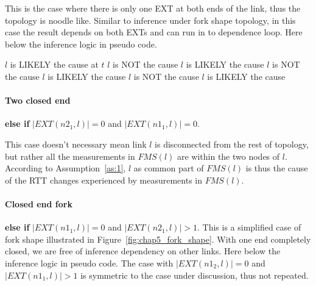 This is the case where there is only one \ac{EXT} at both ends of the link, thus the topology is noodle like.
Similar to inference under fork shape topology, in this case the result depends on both \acp{EXT} and can run in to dependence loop. Here below the inference logic in pseudo code.

\begin{algorithmic}
	\State $l$ is LIKELY the cause at $t$ 
\Else {}
	 
			\State $l$ is NOT the cause 
		\Else
			\State $l$ is LIKELY the cause 
		\EndIf
	 
			\State $l$ is NOT the cause 
		\Else
			\State $l$ is LIKELY the cause 
		\EndIf
	\Else {}
			\State $l$ is NOT the cause 
		\Else
			\State $l$ is LIKELY the cause 
		\EndIf
	\EndIf
\EndIf
\end{algorithmic}

\paragraph{Two closed end} \textbf{else if} $|EXT(n2_1,l)| = 0$ and $|EXT(n1_1,l)| = 0$.

This case doesn't necessary mean link $l$ is disconnected from the rest of topology, but rather all the measurements in $FMS(l)$ are within the two nodes of $l$. According to Assumption~\ref{as:1}, $l$ as common part of $FMS(l)$ is thus the cause of the RTT changes experienced by measurements in $FMS(l)$.


\paragraph{Closed end fork} \textbf{else if } $|EXT(n1_1,l)| = 0$ and $|EXT(n2_1,l)| > 1$.
This is a simplified case of fork shape illustrated in Figure~\ref{fig:chap5_fork_shape}.
With one end completely closed, we are free of inference dependency on other links.
Here below the inference logic in pseudo code. The case with $|EXT(n1_2,l)| = 0$ and $|EXT(n1_1,l)| > 1$ is symmetric to the case under discussion, thus not repeated.

